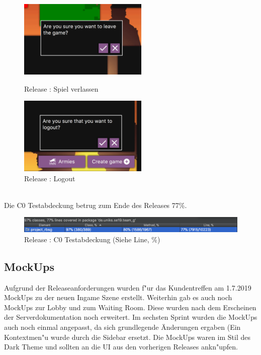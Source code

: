\documentclass[12pt, titlepage]{scrartcl}
\newcommand{\RN}[1]{%
	\textup{\uppercase\expandafter{\romannumeral#1}}%
}
\begin{document}
		        \begin{figure}[H]
                    \centering
                    \begin{minipage}{0.55\textwidth}
                        \centering
                        \includegraphics[width=0.55\textwidth]{images/old_state/additional/LeaveGame.png}
                        \caption{Release \RN{2}: Spiel verlassen}
                        \label{Leave_Game}
                    \end{minipage}%
                    \begin{minipage}{0.55\textwidth}
                        \centering
                        \includegraphics[width=0.55\textwidth]{images/old_state/additional/Logout.png}
                        \caption{Release \RN{2}: Logout}
                        \label{Logout}
                    \end{minipage}
                \end{figure}
                \ \\ Die C0 Testabdeckung betrug zum Ende des Releases \RN{2} 77\%.
                \begin{figure}[H] 
    				\centering
    				\includegraphics[width=\textwidth]{images/old_state/Coverage.png}
    				\caption{Release \RN{2}: C0 Testabdeckung (Siehe Line, \%)}
    				\label{Coverage}
			    \end{figure}
    \newpage
	    \subsection{MockUps}
	        Aufgrund der Releaseanforderungen wurden f"ur das Kundentreffen am 1.7.2019 MockUps zu der neuen Ingame Szene erstellt. Weiterhin gab es auch noch MockUps zur Lobby und zum Waiting Room. Diese wurden nach dem Erscheinen der Serverdokumentation noch erweitert. Im sechsten Sprint wurden die MockUps auch noch einmal angepasst, da sich grundlegende \"Anderungen ergaben (Ein Kontextmen"u wurde durch die Sidebar ersetzt. Die MockUps waren im Stil des Dark Theme und sollten an die UI aus den vorherigen Releases ankn"upfen.
\end{document}
